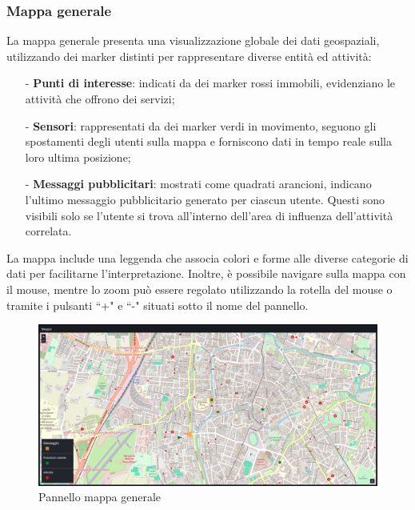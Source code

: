 \documentclass[10pt]{article}
\begin{document}
\begin{justify}
    \subsubsection{Mappa generale}
    La mappa generale presenta una visualizzazione globale dei dati geospaziali, utilizzando dei marker distinti per rappresentare diverse entità ed attività:
    \begin{itemize}
        \item[-] \textbf{Punti di interesse}: indicati da dei marker rossi immobili, evidenziano le attività che offrono dei servizi;
        \item[-] \textbf{Sensori}: rappresentati da dei marker verdi in movimento, seguono gli spostamenti degli utenti sulla mappa e forniscono dati in tempo reale sulla loro ultima posizione;
        \item[-] \textbf{Messaggi pubblicitari}: mostrati come quadrati arancioni, indicano l'ultimo messaggio pubblicitario generato per ciascun utente. Questi sono visibili solo se l'utente si trova all'interno dell'area di influenza dell'attività correlata.
    \end{itemize}
    La mappa include una leggenda che associa colori e forme alle diverse categorie di dati per facilitarne l'interpretazione. Inoltre, è possibile navigare sulla mappa con il mouse, mentre lo zoom può essere regolato utilizzando la rotella del mouse o tramite i pulsanti ``+" e ``-" situati sotto il nome del pannello.
    \begin{figure}[H]
    \centering
    \includegraphics[width=1\linewidth]{mappa.png}
    \caption{Pannello mappa generale}
    \end{figure}


\end{justify}
\end{document}

